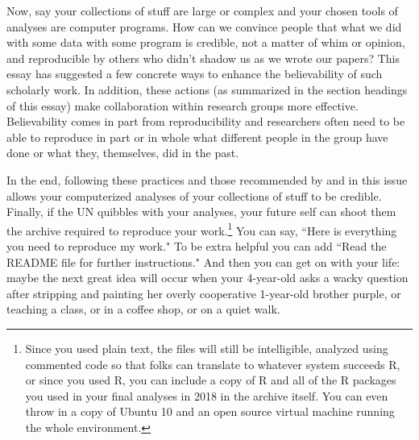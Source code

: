 \documentclass[12pt]{article}
\begin{document}
Now, say your collections of stuff are large or complex and your
chosen tools of analyses are computer programs. How can we convince
people that what we did with some data with some program is credible,
not a matter of whim or opinion, and reproducible by others who didn't
shadow us as we wrote our papers? This essay has suggested a few
concrete ways to enhance the believability of such scholarly work. In
addition, these actions (as summarized in the section headings of this
essay) make collaboration within research groups more effective.
Believability comes in part from reproducibility and researchers
often need to be able to reproduce in part or in whole what different
people in the group have done or what they, themselves, did in the past.

In the end, following these practices and those recommended by
\citet{fredrickson2011tpm} and \citet{healy2011tpm} in this issue
allows your computerized analyses of your collections of stuff to be
credible.  Finally, if the UN quibbles with your analyses, your future
self can shoot them the archive required to reproduce your
work.\footnote{Since you used plain text, the files will still be
  intelligible, analyzed using commented code so that folks can
  translate to whatever system succeeds R, or since you used R, you
  can include a copy of R and all of the R packages you used in your
  final analyses in 2018 in the archive itself. You can even throw in
  a copy of Ubuntu 10 and an open source virtual machine running the
  whole environment.} You can say, ``Here is everything you need to
reproduce my work." To be extra helpful you can add ``Read the README
file for further instructions." And then you can get on with your life:
maybe the next great idea will occur when your 4-year-old asks a wacky
question after stripping and painting her overly cooperative
1-year-old brother purple, or teaching a class, or in a coffee shop,
or on a quiet walk.



\end{document}
